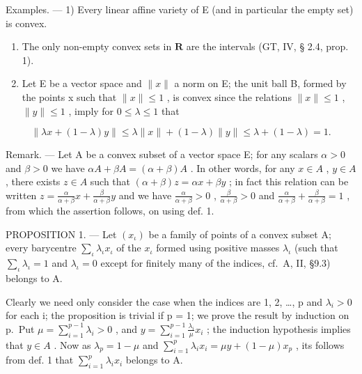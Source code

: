 Examples. --- 1) Every linear affine variety of E (and in particular the empty set) is convex.

\begin{enumerate}
\def\labelenumi{\arabic{enumi})}
\setcounter{enumi}{1}
\item
  The only non-empty convex sets in \(\mathbf{R}\) are the intervals (GT, IV, § 2.4, prop. 1).
\item
  Let E be a vector space and \(\|x\|\) a norm on E; the unit ball B, formed by the points x such that \(\| x\| \leqslant 1\) , is convex since the relations \(\| x\| \leqslant 1\) , \(\| y\| \leqslant 1\) , imply for \(0\leqslant \lambda \leqslant 1\) that
\end{enumerate}

\[
\left\| \lambda x + (1 - \lambda) y \right\| \leqslant \lambda \| x \| + (1 - \lambda) \| y \| \leqslant \lambda + (1 - \lambda) = 1.
\]

Remark. --- Let A be a convex subset of a vector space E; for any scalars \(\alpha > 0\) and \(\beta > 0\) we have \(\alpha A + \beta A = (\alpha + \beta) A\) . In other words, for any \(x \in A\) , \(y \in A\) , there exists \(z \in A\) such that \((\alpha + \beta) z = \alpha x + \beta y\) ; in fact this relation can be written \(z = \frac{\alpha}{\alpha + \beta} x + \frac{\beta}{\alpha + \beta} y\) and we have \(\frac{\alpha}{\alpha + \beta} > 0\) , \(\frac{\beta}{\alpha + \beta} > 0\) and \(\frac{\alpha}{\alpha + \beta} + \frac{\beta}{\alpha + \beta} = 1\) , from which the assertion follows, on using def. 1.

PROPOSITION 1. --- Let \((x_{\iota})\) be a family of points of a convex subset A; every barycentre \(\sum_{\iota} \lambda_{\iota} x_{\iota}\) of the \(x_{\iota}\) formed using positive masses \(\lambda_{\iota}\) (such that \(\sum_{\iota} \lambda_{\iota} = 1\) and \(\lambda_{\iota} = 0\) except for finitely many of the indices, cf.~A, II, §9.3) belongs to A.

Clearly we need only consider the case when the indices are 1, 2, \ldots, p and \(\lambda_{i} > 0\) for each i; the proposition is trivial if p = 1; we prove the result by induction on p.~Put \(\mu = \sum_{i=1}^{p-1} \lambda_{i} > 0\) , and \(y = \sum_{i=1}^{p-1} \frac{\lambda_{i}}{\mu} x_{i}\) ; the induction hypothesis implies that \(y \in A\) . Now as \(\lambda_{p} = 1 - \mu\) and \(\sum_{i=1}^{p} \lambda_{i} x_{i} = \mu y + (1 - \mu) x_{p}\) , its follows from def. 1 that \(\sum_{i=1}^{p} \lambda_{i} x_{i}\) belongs to A.

